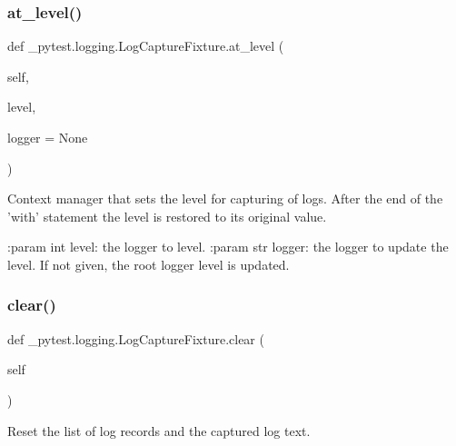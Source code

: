 \subsubsection{\texorpdfstring{at\+\_\+level()}{at\_level()}}
{\footnotesize\ttfamily def \+\_\+pytest.\+logging.\+Log\+Capture\+Fixture.\+at\+\_\+level (\begin{DoxyParamCaption}\item[{}]{self,  }\item[{}]{level,  }\item[{}]{logger = {\ttfamily None} }\end{DoxyParamCaption})}

\begin{DoxyVerb}Context manager that sets the level for capturing of logs. After the end of the 'with' statement the
level is restored to its original value.

:param int level: the logger to level.
:param str logger: the logger to update the level. If not given, the root logger level is updated.
\end{DoxyVerb}
 \mbox{\label{class__pytest_1_1logging_1_1_log_capture_fixture_afabeb49ab9e53e42cdaf70c60c249225}} 
\subsubsection{\texorpdfstring{clear()}{clear()}}
{\footnotesize\ttfamily def \+\_\+pytest.\+logging.\+Log\+Capture\+Fixture.\+clear (\begin{DoxyParamCaption}\item[{}]{self }\end{DoxyParamCaption})}

\begin{DoxyVerb}Reset the list of log records and the captured log text.\end{DoxyVerb}
 \mbox{\label{class__pytest_1_1logging_1_1_log_capture_fixture_a48adea0085ebd2742cc9f508e65e5c9c}} 
